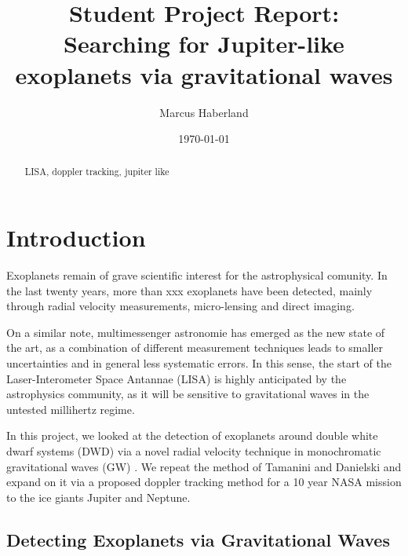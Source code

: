 \documentclass[%
 reprint,
 preprintnumbers,
 nofootinbib,
 amsmath,amssymb,
 aps,
]{revtex4-2}
\begin{document}

\title{Student Project Report:\\Searching for Jupiter-like exoplanets via gravitational waves}

\author{Marcus Haberland}

\date{\today}

\begin{abstract}
LISA, doppler tracking, jupiter like
\end{abstract}

\maketitle


\section{\label{sec:level1}Introduction}

Exoplanets remain of grave scientific interest for the astrophysical comunity. In the last twenty years, more than xxx exoplanets have been detected, mainly through radial velocity measurements, micro-lensing and direct imaging.

On a similar note, multimessenger astronomie has emerged as the new state of the art, as a combination of different measurement techniques leads to smaller uncertainties and in general less systematic errors. In this sense, the start of the Laser-Interometer Space Antannae (LISA) is highly anticipated by the astrophysics community, as it will be sensitive to gravitational waves in the untested millihertz regime.

In this project, we looked at the detection of exoplanets around double white dwarf systems (DWD) via a novel radial velocity technique in monochromatic gravitational waves (GW) \cite{Tamanini}. We repeat the method of Tamanini and Danielski and expand on it via a proposed doppler tracking method for a 10 year NASA mission to the ice giants Jupiter and Neptune.

\subsection{Detecting Exoplanets via Gravitational Waves}
\end{document}
